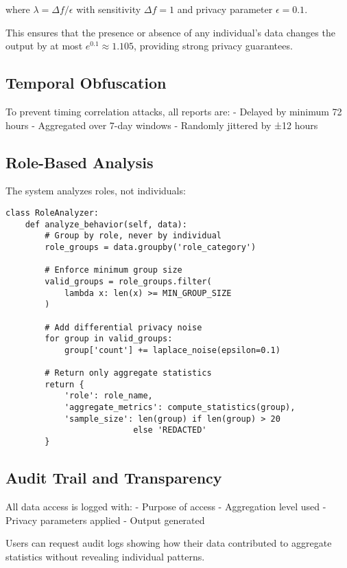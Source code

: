 \documentclass[11pt,a4paper]{article}
\begin{document}
where $\lambda = \Delta f / \epsilon$ with sensitivity $\Delta f = 1$ and privacy parameter $\epsilon = 0.1$.

This ensures that the presence or absence of any individual's data changes the output by at most $e^{0.1} \approx 1.105$, providing strong privacy guarantees.

\subsection{Temporal Obfuscation}

To prevent timing correlation attacks, all reports are:
- Delayed by minimum 72 hours
- Aggregated over 7-day windows
- Randomly jittered by ±12 hours

\subsection{Role-Based Analysis}

The system analyzes roles, not individuals:

\begin{lstlisting}[caption={Privacy-Preserving Role Analysis}]
class RoleAnalyzer:
    def analyze_behavior(self, data):
        # Group by role, never by individual
        role_groups = data.groupby('role_category')
        
        # Enforce minimum group size
        valid_groups = role_groups.filter(
            lambda x: len(x) >= MIN_GROUP_SIZE
        )
        
        # Add differential privacy noise
        for group in valid_groups:
            group['count'] += laplace_noise(epsilon=0.1)
        
        # Return only aggregate statistics
        return {
            'role': role_name,
            'aggregate_metrics': compute_statistics(group),
            'sample_size': len(group) if len(group) > 20 
                          else 'REDACTED'
        }
\end{lstlisting}

\subsection{Audit Trail and Transparency}

All data access is logged with:
- Purpose of access
- Aggregation level used
- Privacy parameters applied
- Output generated

Users can request audit logs showing how their data contributed to aggregate statistics without revealing individual patterns.
\end{document}
